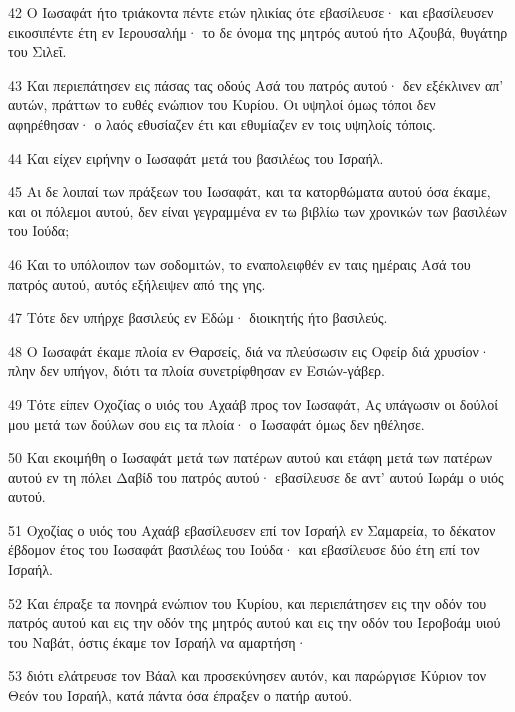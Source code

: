 \par 42 Ο Ιωσαφάτ ήτο τριάκοντα πέντε ετών ηλικίας ότε εβασίλευσε· και εβασίλευσεν εικοσιπέντε έτη εν Ιερουσαλήμ· το δε όνομα της μητρός αυτού ήτο Αζουβά, θυγάτηρ του Σιλεΐ.
\par 43 Και περιεπάτησεν εις πάσας τας οδούς Ασά του πατρός αυτού· δεν εξέκλινεν απ' αυτών, πράττων το ευθές ενώπιον του Κυρίου. Οι υψηλοί όμως τόποι δεν αφηρέθησαν· ο λαός εθυσίαζεν έτι και εθυμίαζεν εν τοις υψηλοίς τόποις.
\par 44 Και είχεν ειρήνην ο Ιωσαφάτ μετά του βασιλέως του Ισραήλ.
\par 45 Αι δε λοιπαί των πράξεων του Ιωσαφάτ, και τα κατορθώματα αυτού όσα έκαμε, και οι πόλεμοι αυτού, δεν είναι γεγραμμένα εν τω βιβλίω των χρονικών των βασιλέων του Ιούδα;
\par 46 Και το υπόλοιπον των σοδομιτών, το εναπολειφθέν εν ταις ημέραις Ασά του πατρός αυτού, αυτός εξήλειψεν από της γης.
\par 47 Τότε δεν υπήρχε βασιλεύς εν Εδώμ· διοικητής ήτο βασιλεύς.
\par 48 Ο Ιωσαφάτ έκαμε πλοία εν Θαρσείς, διά να πλεύσωσιν εις Οφείρ διά χρυσίον· πλην δεν υπήγον, διότι τα πλοία συνετρίφθησαν εν Εσιών-γάβερ.
\par 49 Τότε είπεν Οχοζίας ο υιός του Αχαάβ προς τον Ιωσαφάτ, Ας υπάγωσιν οι δούλοί μου μετά των δούλων σου εις τα πλοία· ο Ιωσαφάτ όμως δεν ηθέλησε.
\par 50 Και εκοιμήθη ο Ιωσαφάτ μετά των πατέρων αυτού και ετάφη μετά των πατέρων αυτού εν τη πόλει Δαβίδ του πατρός αυτού· εβασίλευσε δε αντ' αυτού Ιωράμ ο υιός αυτού.
\par 51 Οχοζίας ο υιός του Αχαάβ εβασίλευσεν επί τον Ισραήλ εν Σαμαρεία, το δέκατον έβδομον έτος του Ιωσαφάτ βασιλέως του Ιούδα· και εβασίλευσε δύο έτη επί τον Ισραήλ.
\par 52 Και έπραξε τα πονηρά ενώπιον του Κυρίου, και περιεπάτησεν εις την οδόν του πατρός αυτού και εις την οδόν της μητρός αυτού και εις την οδόν του Ιεροβοάμ υιού του Ναβάτ, όστις έκαμε τον Ισραήλ να αμαρτήση·
\par 53 διότι ελάτρευσε τον Βάαλ και προσεκύνησεν αυτόν, και παρώργισε Κύριον τον Θεόν του Ισραήλ, κατά πάντα όσα έπραξεν ο πατήρ αυτού.


